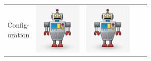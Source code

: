 \documentclass{standalone}
\newcommand{\picHeight}{1in}
\begin{document}
        \begin{tabular}{| c | c | c | c | c |}
            \hline
            \pbox{20cm}{Config-\\uration} &
            \includegraphics[height=\picHeight]{robot-character.jpg} &
            \includegraphics[height=\picHeight]{robot-character.jpg} &

\end{tabular}
\end{document}

